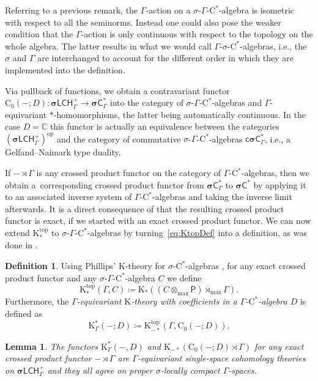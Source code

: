 \documentclass[pdftex]{sigma}
\numberwithin{equation}{section}
\newtheorem{lem}[thm]{Lemma}
\theoremstyle{definition}
\newtheorem{defn}[thm]{Definition}
\newcommand{\C}{\mathbb{C}}
\newcommand{\Ct}{\mathrm{C}}
\newcommand{\Cz}{\Ct_0}
\newcommand{\categoryfont}[1]{\mathsf{#1}}
\newcommand{\sLCHp}[1][\Gamma]{\boldsymbol\sigma\categoryfont{LCH}_{#1}^+}
\newcommand{\sCs}[1][\Gamma]{\boldsymbol\sigma\categoryfont{C}^*_{#1}}
\newcommand{\csCs}[1][\Gamma]{\categoryfont{c}\boldsymbol\sigma\categoryfont{C}^*_{#1}}
\newcommand{\maxtensor}{\mathbin{{\otimes}_{\mathrm{max}}}}
\newcommand{\maxcrossed}{\mathbin{{\rtimes}_{\mathrm{max}}}}
\newcommand{\K}{\mathrm{K}}
\newcommand{\Ktop}{\mathrm{K}^{\mathrm{top}}}
\newcommand{\textCstar}{\ensuremath{\mathrm{C}^*\!}}
\newcommand{\sfP}{\mathsf{P}}
\newcommand{\blank}{-}
\begin{document}
Referring to a previous remark, the $\Gamma$-action on a $\sigma$-$\Gamma$-\textCstar-algebra is isometric with respect to all the seminorms. Instead one could also pose the weaker condition that the $\Gamma$-action is only continuous with respect to the topology on the whole algebra. The latter results in what we would call $\Gamma$-$\sigma$-\textCstar-algebras, i.e., the $\sigma$ and $\Gamma$ are interchanged to account for the different order in which they are implemented into the definition.

Via pullback of functions, we obtain a contravariant functor $\Cz(\blank;D)\colon\sLCHp\to\sCs$
into the category of $\sigma$-$\Gamma$-\textCstar-algebras and $\Gamma$-equivariant $*$-homomorphisms, the latter being automatically continuous. In the case $D=\C$ this functor is actually an equivalence between the categories $(\sLCHp)^{\mathrm{op}}$ and the category of commutative $\sigma$-$\Gamma$-\textCstar-algebras $\csCs$, i.e., a Gelfand--Naimark type duality.

If $\blank\rtimes\Gamma$ is any crossed product functor on the category of $\Gamma$-\textCstar-algebras, then we obtain a~corresponding crossed product functor from $\sCs$ to $\sCs[]$ by applying it to an associated inverse system of $\Gamma$-\textCstar-algebras and taking the inverse limit afterwards. It is a direct consequence of \cite[Proposition~5.3(2)]{PhiInv} that the resulting crossed product functor is exact, if we started with an exact crossed product functor.
We can now extend $\Ktop_*$ to $\sigma$-$\Gamma$-\textCstar-algebras by turning~\eqref{eq:KtopDef} into a definition, as was done in \cite{EmeMeyDescent,EmeMeyEquivariantCoassembly}.

\begin{defn}
Using Phillips' $\K$-theory for $\sigma$-\textCstar-algebras \cite{PhiRep,PhiFre},
for any exact crossed product functor and any $\sigma$-$\Gamma$-\textCstar-algebra $C$ we define
\[
\Ktop_*(\Gamma,C)\coloneqq \K_*((C\maxtensor\sfP)\maxcrossed\Gamma).
\]
Furthermore, the \emph{$\Gamma$-equivariant $\K$-theory with coefficients in a $\Gamma$-\textCstar-algebra $D$} is defined as
\[
\K_\Gamma^*(\blank;D)\coloneqq \Ktop_{-*}(\Gamma,\Cz(\blank;D)).
\]
\end{defn}

\begin{lem}The functors $\K_\Gamma^*(\blank,D)$ and $\K_{-*}(\Cz(\blank;D)\rtimes\Gamma)$ for any exact crossed product functor $\blank\rtimes\Gamma$ are $\Gamma$-equivariant single-space cohomology theories on $\sLCHp$ and they all agree on proper $\sigma$-locally compact $\Gamma$-spaces.
\end{lem}
\end{document}

